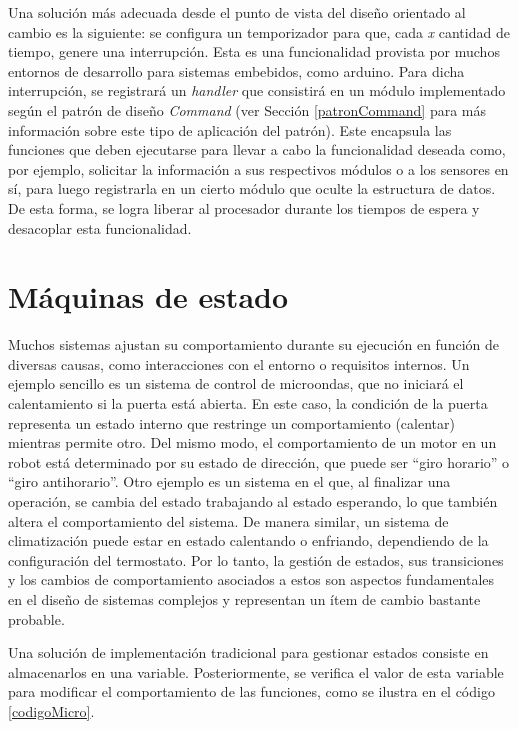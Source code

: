 Una solución más adecuada desde el punto de vista del diseño orientado al cambio es la siguiente: se configura un temporizador para que, cada \textit{x} cantidad de tiempo, genere una interrupción. Esta es una funcionalidad provista por muchos entornos de desarrollo para sistemas embebidos, como \gls{arduino}.
Para dicha interrupción, se registrará un \textit{handler} que consistirá en un módulo implementado según el patrón de diseño \textit{Command} (ver Sección \ref{patronCommand} para más información sobre este tipo de aplicación del patrón). Este encapsula las funciones que deben ejecutarse para llevar a cabo la funcionalidad deseada como, por ejemplo, solicitar la información a sus respectivos módulos \Computador o a los sensores en sí, para luego registrarla en un cierto módulo que oculte la estructura de datos. De esta forma, se logra liberar al procesador durante los tiempos de espera y desacoplar esta funcionalidad.


\section{Máquinas de estado}\label{cap:state}

Muchos sistemas ajustan su comportamiento durante su ejecución en función de diversas causas, como interacciones con el entorno o requisitos internos. Un ejemplo sencillo es un sistema de control de microondas, que no iniciará el calentamiento si la puerta está abierta. En este caso, la condición de la puerta representa un estado interno que restringe un comportamiento (calentar) mientras permite otro. Del mismo modo, el comportamiento de un motor en un robot está determinado por su estado de dirección, que puede ser ``giro horario'' o ``giro antihorario''. Otro ejemplo es un sistema en el que, al finalizar una operación, se cambia del estado trabajando al estado esperando, lo que también altera el comportamiento del sistema. De manera similar, un sistema de climatización puede estar en estado calentando o enfriando, dependiendo de la configuración del termostato. Por lo tanto, la gestión de estados, sus transiciones y los cambios de comportamiento asociados a estos son aspectos fundamentales en el diseño de sistemas complejos y representan un ítem de cambio bastante probable.

Una solución de implementación tradicional para gestionar estados consiste en almacenarlos en una variable. Posteriormente, se verifica el valor de esta variable para modificar el comportamiento de las funciones, como se ilustra en el código \ref{codigoMicro}.

